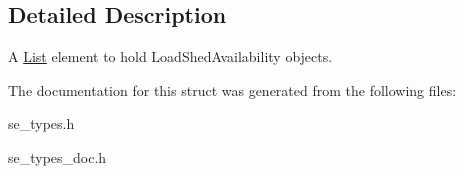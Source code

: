 \subsection{Detailed Description}
A \hyperlink{structList}{List} element to hold Load\+Shed\+Availability objects. 

The documentation for this struct was generated from the following files\+:\begin{DoxyCompactItemize}
\item 
se\+\_\+types.\+h\item 
se\+\_\+types\+\_\+doc.\+h\end{DoxyCompactItemize}
